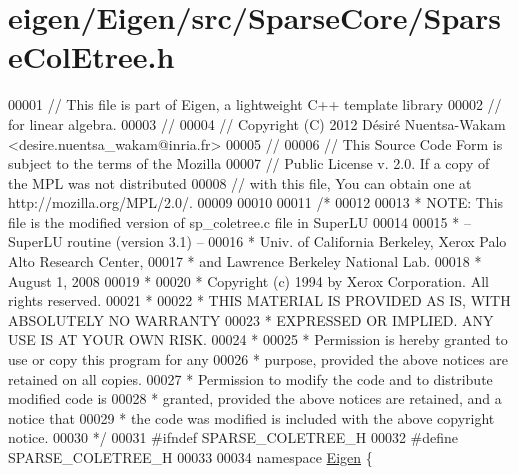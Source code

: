 \hypertarget{eigen_2_eigen_2src_2_sparse_core_2_sparse_col_etree_8h_source}{}\section{eigen/\+Eigen/src/\+Sparse\+Core/\+Sparse\+Col\+Etree.h}
\label{eigen_2_eigen_2src_2_sparse_core_2_sparse_col_etree_8h_source}

\begin{DoxyCode}
00001 \textcolor{comment}{// This file is part of Eigen, a lightweight C++ template library}
00002 \textcolor{comment}{// for linear algebra.}
00003 \textcolor{comment}{//}
00004 \textcolor{comment}{// Copyright (C) 2012 Désiré Nuentsa-Wakam <desire.nuentsa\_wakam@inria.fr>}
00005 \textcolor{comment}{//}
00006 \textcolor{comment}{// This Source Code Form is subject to the terms of the Mozilla}
00007 \textcolor{comment}{// Public License v. 2.0. If a copy of the MPL was not distributed}
00008 \textcolor{comment}{// with this file, You can obtain one at http://mozilla.org/MPL/2.0/.}
00009 
00010 
00011 \textcolor{comment}{/* }
00012 \textcolor{comment}{ }
00013 \textcolor{comment}{ * NOTE: This file is the modified version of sp\_coletree.c file in SuperLU }
00014 \textcolor{comment}{ }
00015 \textcolor{comment}{ * -- SuperLU routine (version 3.1) --}
00016 \textcolor{comment}{ * Univ. of California Berkeley, Xerox Palo Alto Research Center,}
00017 \textcolor{comment}{ * and Lawrence Berkeley National Lab.}
00018 \textcolor{comment}{ * August 1, 2008}
00019 \textcolor{comment}{ *}
00020 \textcolor{comment}{ * Copyright (c) 1994 by Xerox Corporation.  All rights reserved.}
00021 \textcolor{comment}{ *}
00022 \textcolor{comment}{ * THIS MATERIAL IS PROVIDED AS IS, WITH ABSOLUTELY NO WARRANTY}
00023 \textcolor{comment}{ * EXPRESSED OR IMPLIED.  ANY USE IS AT YOUR OWN RISK.}
00024 \textcolor{comment}{ *}
00025 \textcolor{comment}{ * Permission is hereby granted to use or copy this program for any}
00026 \textcolor{comment}{ * purpose, provided the above notices are retained on all copies.}
00027 \textcolor{comment}{ * Permission to modify the code and to distribute modified code is}
00028 \textcolor{comment}{ * granted, provided the above notices are retained, and a notice that}
00029 \textcolor{comment}{ * the code was modified is included with the above copyright notice.}
00030 \textcolor{comment}{ */}
00031 \textcolor{preprocessor}{#ifndef SPARSE\_COLETREE\_H}
00032 \textcolor{preprocessor}{#define SPARSE\_COLETREE\_H}
00033 
00034 \textcolor{keyword}{namespace }\hyperlink{namespace_eigen}{Eigen} \{

\end{DoxyCode}
